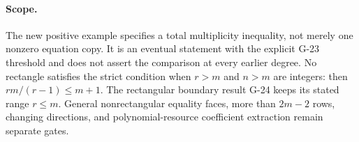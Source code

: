 \paragraph{Scope.}
The new positive example specifies a total multiplicity inequality,
not merely one nonzero equation copy. It is an eventual statement
with the explicit G-23 threshold and does not assert the comparison
at every earlier degree. No rectangle satisfies the strict
condition when $r>m$ and $n>m$ are integers: then
$rm/(r-1)\le m+1$. The rectangular boundary result G-24 keeps
its stated range $r\le m$. General nonrectangular equality
faces, more than $2m-2$ rows, changing directions, and
polynomial-resource coefficient extraction remain separate gates.
